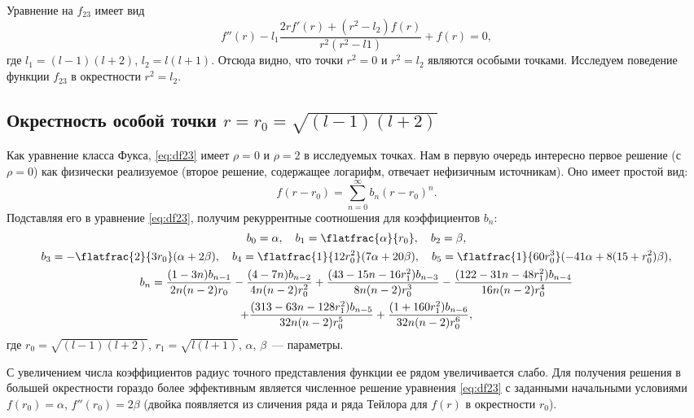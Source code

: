 \documentclass[\docroot/report.tex]{subfiles}
\begin{document}
Уравнение на $f_{23}$ имеет вид
%
\begin{equation}\label{eq:df23}
    f''(r) - l_1 \frac{ 2 r f'(r) + (r^2 - l_2) f(r) }{ r^2 (r^2 - l1) } + f(r) = 0 ,
\end{equation}
%
где $l_1 = (l-1)(l+2)$, $l_2 = l(l+1)$. Отсюда видно, что точки $r^2 = 0$ и $r^2 = l_2$ являются особыми точками. Исследуем поведение функции $f_{23}$ в окрестности $r^2 = l_2$.

%
%
%
%
%
%

\subsection{Окрестность особой точки $r = r_0 = \sqrt{(l-1)(l+2)}$}

Как уравнение класса Фукса, \autoref{eq:df23} имеет $\rho = 0$ и $\rho = 2$ в исследуемых точках. Нам в первую очередь интересно первое решение (с $\rho = 0$) как физически реализуемое (второе решение, содержащее логарифм, отвечает нефизичным источникам). Оно имеет простой вид:
%
\begin{equation}\label{eq:f23-series}
    f(r - r_0) = \sum\limits_{n=0}^\infty b_n (r - r_0)^n .
\end{equation}
%
Подставляя его в уравнение \autoref{eq:df23}, получим рекуррентные соотношения для коэффициентов $b_n$:
%
\begin{equation}\begin{gathered}\label{eq:f23-series-coefs}
    b_0 = \alpha, \quad
    b_1 = \flatfrac{\alpha}{r_0}, \quad
    b_2 = \beta, \\
    b_3 = - \flatfrac{2}{3 r_0} (\alpha + 2 \beta), \quad
    b_4 = \flatfrac{1}{12 r_0^2} (7 \alpha + 20 \beta), \quad
    b_5 = \flatfrac{1}{60 r_0^3} (-41 \alpha + 8 (15 + r_0^2) \beta), \\
    b_n = \frac{(1-3n)b_{n-1}}{2n(n-2)r_0}
        - \frac{(4-7n)b_{n-2}}{4n(n-2)r_0^2}
        + \frac{(43-15n-16r_1^2)b_{n-3}}{8n(n-2)r_0^3}
        - \frac{(122-31n-48r_1^2)b_{n-4}}{16n(n-2)r_0^4} \\
        + \frac{(313-63n-128r_1^2)b_{n-5}}{32n(n-2)r_0^5}
        + \frac{(1+160r_1^2)b_{n-6}}{32n(n-2)r_0^6} ,
\end{gathered}\end{equation}
%
где $r_0 = \sqrt{(l-1)(l+2)}$, $r_1 = \sqrt{l(l+1)}$, $\alpha$, $\beta$~--- параметры.

С увеличением числа коэффициентов радиус точного представления функции ее рядом увеличивается слабо. Для получения решения в большей окрестности гораздо более эффективным является численное решение уравнения \autoref{eq:df23} с заданными начальными условиями $f(r_0) = \alpha$, $f''(r_0) = 2\beta$ (двойка появляется из сличения ряда \label{eq:f23-series} и ряда Тейлора для $f(r)$ в окрестности $r_0$).
\end{document}

